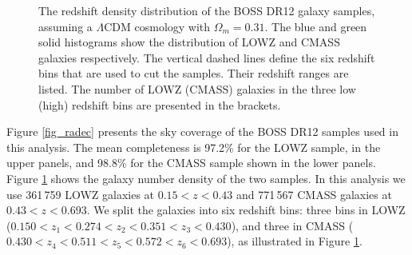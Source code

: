 \documentclass[iop]{emulateapj}
\begin{document}





\begin{figure}
   \caption{\label{fig_nbar}
      The redshift density distribution of the BOSS DR12 galaxy samples, assuming a $\Lambda$CDM cosmology with $\Omega_m=0.31$.
      The blue and green solid histograms show the distribution of LOWZ and CMASS galaxies respectively. 
      The vertical dashed lines define the six redshift bins that are used to cut the samples.
      Their redshift ranges are listed.
      The number of LOWZ (CMASS) galaxies in the three low (high) redshift bins are presented in the brackets.
      }
\end{figure}

Figure \ref{fig_radec} presents the sky coverage of the BOSS DR12 samples used in this analysis. 
The mean completeness is 97.2\% for the LOWZ sample, in the upper panels, and 98.8\% for the CMASS sample shown in the lower panels.
Figure \ref{fig_nbar} shows the galaxy number density of the two samples.
In this analysis we use 361\,759 LOWZ galaxies at $0.15<z <0.43$ and 
771\,567 CMASS galaxies at $0.43< z < 0.693$.
We split the galaxies into six redshift bins: 
three bins in LOWZ ($0.150<z_1<0.274<z_2<0.351<z_3<0.430$), 
and three in CMASS ($0.430<z_4<0.511<z_5<0.572<z_6<0.693$), 
as illustrated in Figure \ref{fig_nbar}.
\end{document}
